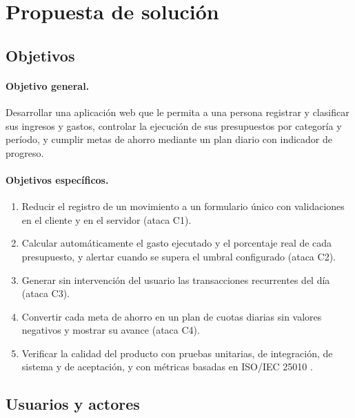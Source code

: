 \section{Propuesta de solución}

\subsection{Objetivos}

\paragraph{Objetivo general.} Desarrollar una aplicación web que le permita a una persona registrar y clasificar sus ingresos y gastos, controlar la ejecución de sus presupuestos por categoría y período, y cumplir metas de ahorro mediante un plan diario con indicador de progreso.

\paragraph{Objetivos específicos.}
\begin{enumerate}[label=OE\arabic*., leftmargin=1.6cm]
  \item Reducir el registro de un movimiento a un formulario único con validaciones en el cliente y en el servidor (ataca C1).
  \item Calcular automáticamente el gasto ejecutado y el porcentaje real de cada presupuesto, y alertar cuando se supera el umbral configurado (ataca C2).
  \item Generar sin intervención del usuario las transacciones recurrentes del día (ataca C3).
  \item Convertir cada meta de ahorro en un plan de cuotas diarias sin valores negativos y mostrar su avance (ataca C4).
  \item Verificar la calidad del producto con pruebas unitarias, de integración, de sistema y de aceptación, y con métricas basadas en ISO/IEC 25010 \parencite{iso25010}.
\end{enumerate}

\subsection{Usuarios y actores}

